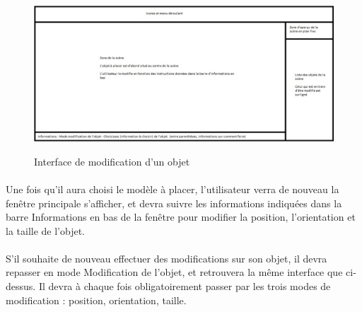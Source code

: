 \begin{figure}[H]
  \centering
  \includegraphics[scale=0.6]{interfacemodifs}
  \label{fig:interfacemodifs}
  \caption{Interface de modification d'un objet}
\end{figure}

\paragraph{}
Une fois qu’il aura choisi le modèle à placer, l’utilisateur verra de nouveau la fenêtre principale s’afficher, et devra suivre les informations indiquées dans la barre Informations en bas de la fenêtre pour modifier la position, l’orientation et la taille de l’objet.

\paragraph{}
S’il souhaite de nouveau effectuer des modifications sur son objet, il devra repasser en mode Modification de l’objet, et retrouvera la même interface que ci-dessus. Il devra à chaque fois obligatoirement passer par les trois modes de modification : position, orientation, taille.
